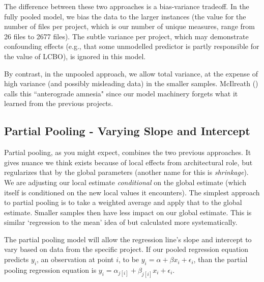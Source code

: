 \documentclass[sigconf,natbib=false]{acmart}
\begin{document}
The difference between these two approaches is a bias-variance tradeoff. In the fully pooled model, we bias the data to the larger instances (the value for the number of files per project, which is our number of unique measures, range from 26 files to 2677 files). The subtle variance per project, which may demonstrate confounding effects (e.g., that some unmodelled predictor is partly responsible for the value of LCBO), is ignored in this model.

By contrast, in the unpooled approach, we allow total variance, at the expense of high variance (and possibly misleading data) in the smaller samples. McIlreath (\cite{mcilreath16}) calls this ``anterograde amnesia" since our model machinery forgets what it learned from the previous projects. 

\subsection{Partial Pooling - Varying Slope and Intercept}

Partial pooling, as you might expect, combines the two previous approaches. It gives nuance we think exists because of local effects from architectural role, but regularizes that by the global parameters (another name for this is \emph{shrinkage}). We are adjusting our local estimate \emph{conditional} on the global estimate (which itself is conditioned on the new local values it encounters). The simplest approach to partial pooling is to take a weighted average and apply that to the global estimate. Smaller samples then have less impact on our global estimate. This is similar `regression to the mean' idea of \cite{JORGENSEN2003} but calculated more systematically.

The partial pooling model will allow the regression line's slope and intercept to vary based on data from the specific project. If our pooled regression equation predicts $y_i$, an observation at point $i$, to be  $y_i = \alpha + \beta x_i + \epsilon_i$, than the partial pooling regression equation is $y_i = \alpha_{j[i]} + \beta_{j[i]} x_{i} + \epsilon_i$. 
\end{document}
